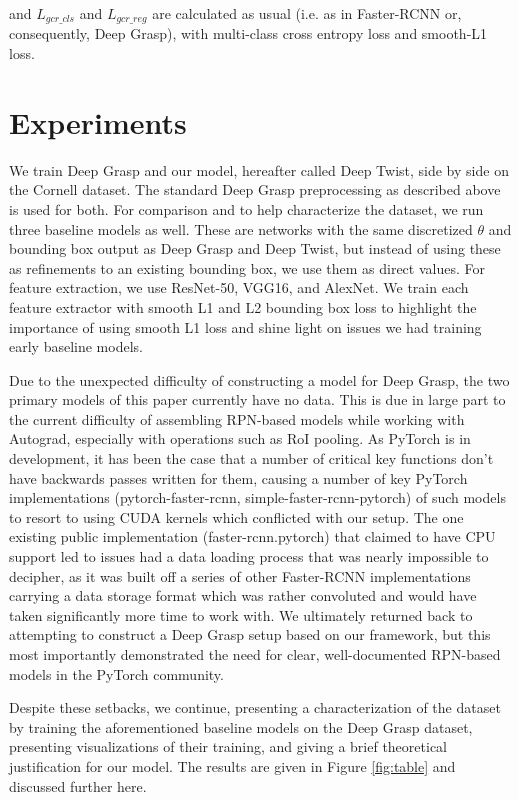 \documentclass[10pt,twocolumn,letterpaper]{article}
\begin{document}
and $L_{gcr\_cls}$ and $L_{gcr\_reg}$ are calculated as usual (i.e. as in Faster-RCNN or, consequently, Deep Grasp), with multi-class cross entropy loss and smooth-L1 loss.

\section{Experiments}

We train Deep Grasp and our model, hereafter called Deep Twist, side by side on the Cornell dataset. The standard Deep Grasp preprocessing as described above is used for both. For comparison and to help characterize the dataset, we run three baseline models as well. These are networks with the same discretized $\theta$ and bounding box output as Deep Grasp and Deep Twist, but instead of using these as refinements to an existing bounding box, we use them as direct values. For feature extraction, we use ResNet-50, VGG16, and AlexNet. We train each feature extractor with smooth L1 and L2 bounding box loss to highlight the importance of using smooth L1 loss and shine light on issues we had training early baseline models. 

Due to the unexpected difficulty of constructing a model for Deep Grasp, the two primary models of this paper currently have no data. This is due in large part to the current difficulty of assembling RPN-based models while working with Autograd, especially with operations such as RoI pooling. As PyTorch is in development, it has been the case that a number of critical key functions don't have backwards passes written for them, causing a number of key PyTorch implementations (pytorch-faster-rcnn, simple-faster-rcnn-pytorch) of such models to resort to using CUDA kernels which conflicted with our setup. The one existing public implementation (faster-rcnn.pytorch) that claimed to have CPU support led to issues had a data loading process that was nearly impossible to decipher, as it was built off a series of other Faster-RCNN implementations carrying a data storage format which was rather convoluted and would have taken significantly more time to work with. We ultimately returned back to attempting to construct a Deep Grasp setup based on our framework, but this most importantly demonstrated the need for clear, well-documented RPN-based models in the PyTorch community. 

Despite these setbacks, we continue, presenting a characterization of the dataset by training the aforementioned baseline models on the Deep Grasp dataset, presenting visualizations of their training, and giving a brief theoretical justification for our model. The results are given in Figure \ref{fig:table} and discussed further here. 
\end{document}
